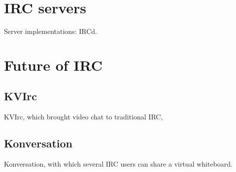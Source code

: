 \section{IRC servers}
\label{sec:IRC-servers}

Server implementations:
 IRCd.
 
\section{Future of IRC}

\subsection{KVIrc}

KVIrc, which brought video chat to traditional IRC, 

\subsection{Konversation}

Konversation, with which several IRC users can share a virtual whiteboard.
